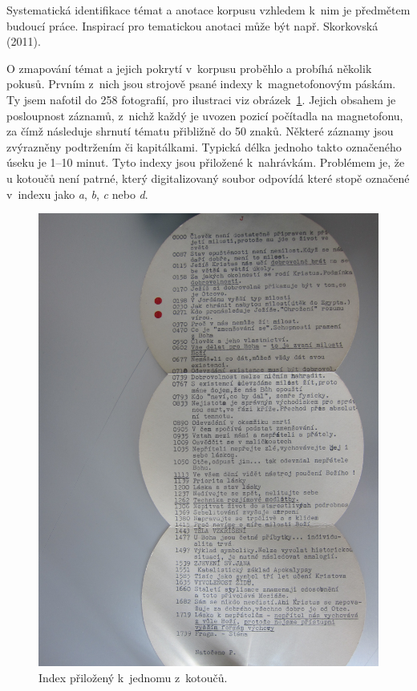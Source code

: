 Systematická
identifikace témat a anotace korpusu vzhledem k~nim je předmětem budoucí práce.
Inspirací pro tematickou anotaci může být např. Skorkovská (2011)\cite{skorkovska2011automatic}.


O zmapování témat a jejich pokrytí v~korpusu proběhlo a probíhá několik pokusů.
Prvním z~nich jsou strojově psané indexy k~magnetofonovým
páskám. Ty jsem nafotil do 258 fotografií, pro ilustraci viz
obrázek~\ref{fig:index-kotouc}. Jejich obsahem je posloupnost
záznamů, z~nichž každý je uvozen pozicí počítadla na magnetofonu, za čímž
následuje shrnutí tématu přibližně do 50 znaků. Některé záznamy jsou zvýrazněny
podtržením či kapitálkami. Typická délka jednoho takto označeného úseku je 1--10
minut. Tyto indexy jsou přiložené k~nahrávkám. Problémem je, že u kotoučů
není patrné, který digitalizovaný soubor odpovídá které stopě označené v~indexu
jako {\em a}, {\em b}, {\em c} nebo {\em d}.

\begin{figure}[htpb]
\includegraphics[scale=0.192]{rc/index-kotouc.jpg}
\caption{Index přiložený k~jednomu z~kotoučů.}
\label{fig:index-kotouc}
\end{figure}

